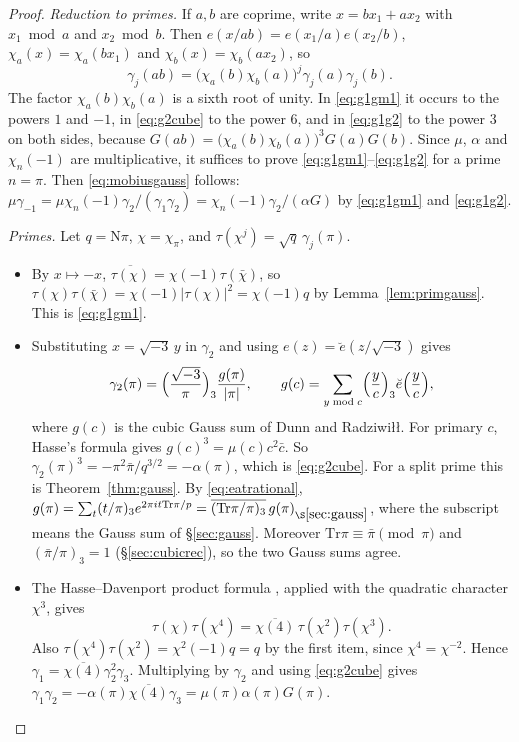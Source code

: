 \documentclass[11pt]{article}
\numberwithin{equation}{section}
\newcommand{\N}{\mathrm N}
\newcommand{\Tr}{\mathrm{Tr}}
\theoremstyle{definition}
\theoremstyle{remark}
\begin{document}
\begin{proof}
\emph{Reduction to primes.} If $a,b$ are coprime, write $x=bx_1+ax_2$ with $x_1\bmod a$ and $x_2\bmod b$.
Then $e(x/ab)=e(x_1/a)e(x_2/b)$, $\chi_a(x)=\chi_a(bx_1)$ and $\chi_b(x)=\chi_b(ax_2)$, so
\begin{equation}\label{eq:gammacrt}
 \gamma_j(ab)=\bigl(\chi_a(b)\chi_b(a)\bigr)^j\gamma_j(a)\gamma_j(b).
\end{equation}
The factor $\chi_a(b)\chi_b(a)$ is a sixth root of unity. In \eqref{eq:g1gm1} it occurs to the powers $1$ and
$-1$, in \eqref{eq:g2cube} to the power $6$, and in \eqref{eq:g1g2} to the power $3$ on both sides, because
$G(ab)=\bigl(\chi_a(b)\chi_b(a)\bigr)^3G(a)G(b)$. Since $\mu$, $\alpha$ and $\chi_n(-1)$ are multiplicative,
it suffices to prove \eqref{eq:g1gm1}--\eqref{eq:g1g2} for a prime $n=\pi$. Then \eqref{eq:mobiusgauss}
follows: $\mu\gamma_{-1}=\mu\chi_n(-1)\gamma_2/(\gamma_1\gamma_2)=\chi_n(-1)\gamma_2/(\alpha G)$ by
\eqref{eq:g1gm1} and \eqref{eq:g1g2}.

\emph{Primes.} Let $q=\N\pi$, $\chi=\chi_\pi$, and $\tau(\chi^j)=\sqrt q\,\gamma_j(\pi)$.
\begin{itemize}
\item By $x\mapsto-x$, $\overline{\tau(\chi)}=\chi(-1)\tau(\bar\chi)$, so $\tau(\chi)\tau(\bar\chi)=\chi(-1)|\tau(\chi)|^2=\chi(-1)q$
by Lemma~\ref{lem:primgauss}. This is \eqref{eq:g1gm1}.
\item Substituting $x=\sqrt{-3}\,y$ in $\gamma_2$ and using $e(z)=\breve e(z/\sqrt{-3})$ gives
\begin{equation}\label{eq:g2DR}
 \gamma_2(\pi)=\Bigl(\frac{\sqrt{-3}}\pi\Bigr)_3\frac{g(\pi)}{|\pi|},\qquad
 g(c)=\sum_{y\bmod c}\Bigl(\frac yc\Bigr)_3\breve e\Bigl(\frac yc\Bigr),
\end{equation}
where $g(c)$ is the cubic Gauss sum of Dunn and Radziwi\l\l. For primary $c$, Hasse's formula
\cite[\S2]{DR} gives $g(c)^3=\mu(c)c^2\bar c$. So $\gamma_2(\pi)^3=-\pi^2\bar\pi/q^{3/2}=-\alpha(\pi)$, which is
\eqref{eq:g2cube}. For a split prime this is Theorem~\ref{thm:gauss}. By \eqref{eq:eatrational},
$g(\pi)=\sum_t(t/\pi)_3e^{2\pi it\Tr\pi/p}=\overline{(\Tr\pi/\pi)_3}\,g(\pi)_{\S\ref{sec:gauss}}$, where the
subscript means the Gauss sum of \S\ref{sec:gauss}. Moreover $\Tr\pi\equiv\bar\pi\pmod\pi$ and
$(\bar\pi/\pi)_3=1$ (\S\ref{sec:cubicrec}), so the two Gauss sums agree.
\item The Hasse--Davenport product formula \cite{DH}, applied with the quadratic character $\chi^3$, gives
\begin{equation}\label{eq:hd}
 \tau(\chi)\tau(\chi^4)=\overline{\chi(4)}\,\tau(\chi^2)\tau(\chi^3).
\end{equation}
Also $\tau(\chi^4)\tau(\chi^2)=\chi^2(-1)q=q$ by the first item, since $\chi^4=\chi^{-2}$. Hence
$\gamma_1=\overline{\chi(4)}\gamma_2^2\gamma_3$. Multiplying by $\gamma_2$ and using \eqref{eq:g2cube} gives
$\gamma_1\gamma_2=-\alpha(\pi)\overline{\chi(4)}\gamma_3=\mu(\pi)\alpha(\pi)G(\pi)$.\qedhere
\end{itemize}
\end{proof}
\end{document}
